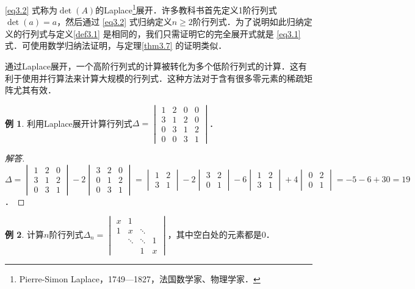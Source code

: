 \documentclass[a4paper,fontset=windows]{ctexbook}
\theoremstyle{definition}
\newtheorem{example}{例}[chapter]
\renewcommand{\ge}{\geqslant}
\begin{document}
\eqref{eq3.2} 式称为$\det(A)$的Laplace\footnote{Pierre-Simon Laplace，1749—1827，法国数学家、物理学家．}展开．许多教科书首先定义1阶行列式$\det(a)=a$，然后通过 \eqref{eq3.2} 式归纳定义$n\ge 2$阶行列式．为了说明如此归纳定义的行列式与定义\ref{def3.1} 是相同的，我们只需证明它的完全展开式就是 \eqref{eq3.1} 式．可使用数学归纳法证明，与定理\ref{thm3.7} 的证明类似．

通过Laplace展开，一个高阶行列式的计算被转化为多个低阶行列式的计算．这有利于使用并行算法来计算大规模的行列式．这种方法对于含有很多零元素的稀疏矩阵尤其有效．

\begin{example}
利用Laplace展开计算行列式$\Delta=\begin{vmatrix}1&2&0&0 \\ 3&1&2&0 \\ 0&3&1&2 \\ 0&0&3&1\end{vmatrix}$．
\end{example}

\begin{proof}[解答]
$\Delta=\begin{vmatrix}1&2&0 \\ 3&1&2 \\ 0&3&1\end{vmatrix}-2\begin{vmatrix}3&2&0 \\ 0&1&2 \\ 0&3&1\end{vmatrix}=\begin{vmatrix}1&2 \\ 3&1\end{vmatrix}-2\begin{vmatrix}3&2 \\ 0&1\end{vmatrix}-6\begin{vmatrix}1&2 \\ 3&1\end{vmatrix}+4\begin{vmatrix}0&2 \\ 0&1\end{vmatrix}=-5-6+30=19$．
\end{proof}

\begin{example}\label{ex3.14}
计算$n$阶行列式$\Delta_n=\begin{vmatrix}x&1&& \\ 1&x&\ddots& \\ &\ddots&\ddots&1 \\ &&1&x\end{vmatrix}$，其中空白处的元素都是0．
\end{example}
\end{document}

